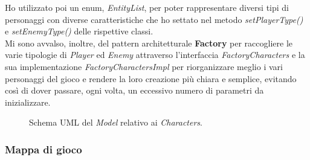 \textsf{\small Ho utilizzato poi un enum, \emph{EntityList}, per poter rappresentare diversi tipi di personaggi con diverse caratteristiche che ho settato nel metodo \emph{setPlayerType()} e \emph{setEnemyType()} delle rispettive classi. }\\

\textsf{\small Mi sono avvalso, inoltre, del pattern architetturale \textbf{Factory} per raccogliere le varie tipologie di \emph{Player} ed \emph{Enemy} attraverso l'interfaccia \emph{FactoryCharacters} e la sua implementazione \emph{FactoryCharactersImpl} per riorganizzare meglio i vari personaggi del gioco e rendere la loro creazione più chiara e semplice, evitando così di dover passare, ogni volta, un eccessivo numero di parametri da inizializzare.}


\begin{figure}[h]
	\centering{} %
	\caption{Schema UML del \emph{Model} relativo ai \emph{Characters}.}
	\label{img:uml_model_characters}
\end{figure}

\subsubsection*{Mappa di gioco}

